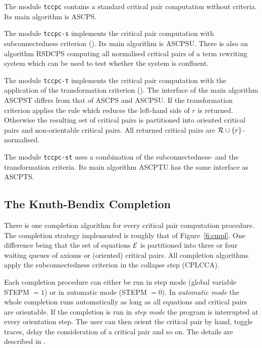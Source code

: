 The module {\tt tccpc} contains a standard critical pair computation 
without criteria.
Its main algorithm is ASCPS.

The module {\tt tccpc-s} implements the critical pair computation with
subconnectedness criterion (\cite{Kuechlin:86}).
Its main algorithm is ASCPSU.
There is also an algorithm RSDCPS computing all normalised critical pairs of
a term rewriting system which can be used to test whether the system is
confluent.

The module {\tt tccpc-t} implements the critical pair computation with
the application of the transformation criterion (\cite{Buendgen:91b}).
The interface of the main algorithm ASCPST differs from that of ASCPS and 
ASCPSU.
If the transformation criterion applies the rule which reduces the left-hand 
side of $r$ is returned.
Otherwise the resulting set of critical pairs is partitioned into
oriented critical pairs and non-orientable critical pairs.
All returned critical pairs are ${\cal R} \cup \{r\}$-normalised.

The module {\tt tccpc-st} uses a combination of the subconnectedness- and the
transformation criteria.
Its main algorithm ASCPTU has the same interface as ASCPTS.

\subsection{The Knuth-Bendix Completion}

There is one completion algorithm for every critical pair computation procedure.
The completion strategy implemented is roughly that of Figure~\ref{fi:cmpl}.
One difference being that the set of equations $\cal E$ is partitioned into 
three or four waiting queues of axioms or (oriented) critical pairs.
All completion algorithms apply the subconnectedness criterion in the
collapse step (CPLCCA).

Each completion procedure can either be run in step mode (global variable 
STEPM $ = 1$) or in automatic mode (STEPM $= 0$).
In {\em automatic mode} the whole completion runs automatically as long as all
equations and critical pairs are orientable.
If the completion is run in {\em step mode} the program is interrupted at 
every orientation step.
The user can then orient the critical pair by hand, toggle traces,
delay the consideration of a critical pair and so on.
The details are described in \RUD.

